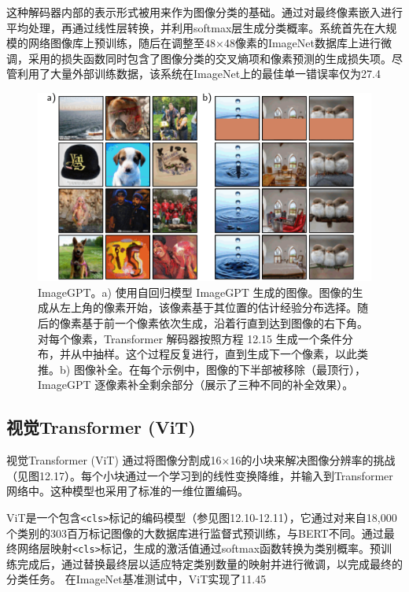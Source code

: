 这种解码器内部的表示形式被用来作为图像分类的基础。通过对最终像素嵌入进行平均处理，再通过线性层转换，并利用softmax层生成分类概率。系统首先在大规模的网络图像库上预训练，随后在调整至48×48像素的ImageNet数据库上进行微调，采用的损失函数同时包含了图像分类的交叉熵项和像素预测的生成损失项。尽管利用了大量外部训练数据，该系统在ImageNet上的最佳单一错误率仅为27.4%

\begin{figure}[ht!]
\centering
\includegraphics[width=0.7\linewidth]{png/chapter12/TransformerIGPT.png}
\caption{ImageGPT。a) 使用自回归模型 ImageGPT 生成的图像。图像的生成从左上角的像素开始，该像素基于其位置的估计经验分布选择。随后的像素基于前一个像素依次生成，沿着行直到达到图像的右下角。对每个像素，Transformer 解码器按照方程 12.15 生成一个条件分布，并从中抽样。这个过程反复进行，直到生成下一个像素，以此类推。b) 图像补全。在每个示例中，图像的下半部被移除（最顶行），ImageGPT 逐像素补全剩余部分（展示了三种不同的补全效果）。}
\end{figure}

\subsection{视觉Transformer (ViT)}
视觉Transformer (ViT) 通过将图像分割成16×16的小块来解决图像分辨率的挑战（见图12.17）。每个小块通过一个学习到的线性变换降维，并输入到Transformer网络中。这种模型也采用了标准的一维位置编码。

ViT是一个包含\texttt{\textless cls\textgreater}标记的编码模型（参见图12.10-12.11），它通过对来自18,000个类别的303百万标记图像的大数据库进行监督式预训练，与BERT不同。通过最终网络层映射\texttt{\textless cls\textgreater}标记，生成的激活值通过softmax函数转换为类别概率。预训练完成后，通过替换最终层以适应特定类别数量的映射并进行微调，以完成最终的分类任务。
在ImageNet基准测试中，ViT实现了11.45%

